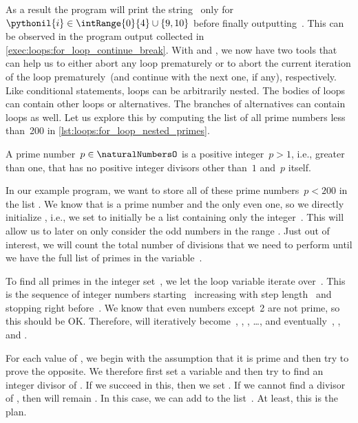 As a result the program will print the string~ only for~$\pythonil{i}\in\intRange{0}{4}\cup\{9, 10\}$ before finally outputting~.
This can be observed in the program output collected in \cref{exec:loops:for_loop_continue_break}.
With  and , we now have two tools that can help us to either abort any loop prematurely or to abort the current iteration of the loop prematurely~(and continue with the next one, if any), respectively.%
%
\FloatBarrier%
\endhsection%
%
%
%
%
%
%
Like conditional statements, loops can be arbitrarily nested.
The bodies of loops can contain other loops or alternatives.
The branches of alternatives can contain loops as well.
Let us explore this by computing the list of all prime numbers less than~200 in \cref{lst:loops:for_loop_nested_primes}.%
%
\begin{definition}%
A prime number~$p\in\naturalNumbersO$ is a positive integer~$p>1$, i.e., greater than one, that has no positive integer divisors other than~$1$ and~$p$ itself.%
\end{definition}%
%
In our example program, we want to store all of these prime numbers~$p<200$ in the list .
We know that  is a prime number and the only even one, so we directly initialize , i.e., we set  to initially be a list containing only the integer~.
This will allow us to later on only consider the odd numbers in the range .
Just out of interest, we will count the total number of divisions that we need to perform until we have the full list of primes in the variable~.%
%
\begin{sloppypar}%
To find all primes in the integer set~, we let the loop variable  iterate over~.
This is the sequence of integer numbers starting~ increasing with step length~ and stopping right before~.
We know that even numbers except~2 are not prime, so this should be OK.
Therefore,  will iteratively become~, , , \dots, and eventually~, , and .%
\end{sloppypar}%
%
For each value of , we begin with the assumption that it is prime and then try to prove the opposite.
We therefore first set a variable  and then try to find an integer divisor of .
If we succeed in this, then we set .
If we cannot find a divisor of , then  will remain .
In this case, we can add  to the list~.
At least, this is the plan.

